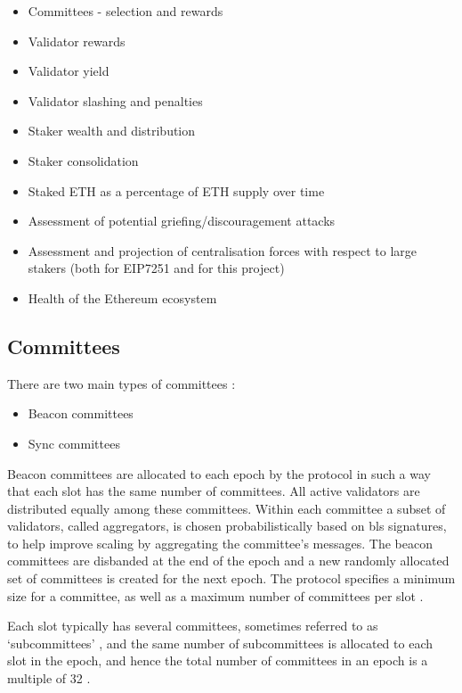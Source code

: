 \documentclass[UTF8]{article}
\begin{document}
{\begin{itemize}
\item Committees - selection and rewards
\item Validator rewards
\item Validator yield
\item Validator slashing and penalties
\item Staker wealth and distribution
\item Staker consolidation
\item Staked ETH as a percentage of ETH supply over time
\item Assessment of potential griefing/discouragement attacks
\item Assessment and projection of centralisation forces with respect to large stakers (both for EIP7251 and for this project)
\item Health of the Ethereum ecosystem
\end{itemize}
\subsection{Committees}
\label{committee}
There are two main types of committees  \cite{Edgington2023}:

\begin{itemize}
\item Beacon committees
\item Sync committees
\end{itemize}

Beacon committees are allocated to each epoch by the protocol in such a way that each slot has the same number of committees. All active validators are distributed equally among these committees. Within each committee a subset of validators, called aggregators, is chosen probabilistically based on \gls{bls} signatures, to help improve scaling by aggregating the committee's messages. The beacon committees are disbanded at the end of the epoch and a new randomly allocated set of committees is created for the next epoch. The protocol specifies a minimum size for a committee, as well as a maximum number of committees per slot \cite{Edgington2023}.

Each slot typically has several committees, sometimes referred to as `subcommittees' \cite{Neuder2023b}, and the same number of subcommittees is allocated to each slot in the epoch, and hence the total number of committees in an epoch is a multiple of 32 \cite{Edgington2023}.

}
\end{document}
